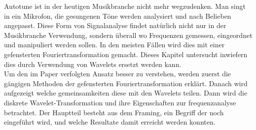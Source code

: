 Autotune ist in der heutigen Musikbranche nicht mehr wegzudenken. Man singt in ein Mikrofon, die gesungenen Töne werden analysiert und nach Belieben angepasst. Diese Form von Signalanalyse findet natürlich nicht nur in der Musikbranche Verwendung, sondern überall wo Frequenzen gemessen, eingeordnet und manipuliert werden sollen. In den meisten Fällen wird dies mit einer gefensterten Fouriertransformation gemacht. Dieses Kapitel untersucht inwiefern dies durch Verwendung von Wavelets ersetzt werden kann.\\

Um den im Paper verfolgten Ansatz besser zu verstehen, werden zuerst die gängigen Methoden der gefensterten Fouriertransformation erklärt. Danach wird aufgezeigt welche gemeinsamkeiten diese mit den Wavelets teilen. Dann wird die diskrete Wavelet-Transformation und ihre Eigenschaften zur frequenzanalyse betrachtet. Der Hauptteil besteht aus dem Framing, ein Begriff der noch eingeführt wird, und welche Resultate damit erreicht werden konnten. 